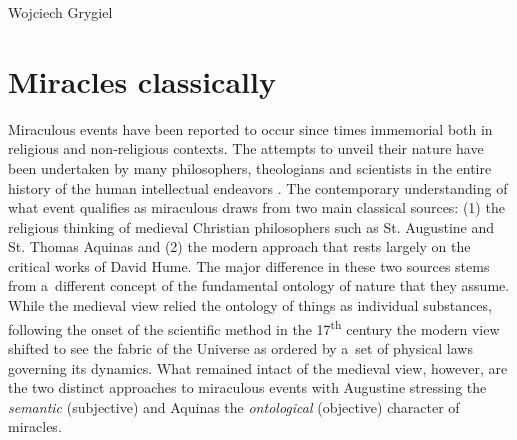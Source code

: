 \begin{artengenv}{Wojciech Grygiel}
\section*{Miracles classically}
Miraculous events have been reported to occur since times immemorial both in religious and non-religious contexts. The attempts to unveil their nature have been undertaken by many philosophers, theologians and scientists in the entire history of the human intellectual endeavors
\parencite[e.g.][]{basinger_miracles_2018}. %
 The contemporary understanding of what event qualifies as miraculous draws from two main classical sources: (1) the religious thinking of medieval Christian philosophers such as St. Augustine and St. Thomas Aquinas and (2) the modern approach that rests largely on the critical works of David Hume. The major difference in these two sources stems from a~different concept of the fundamental ontology of nature that they assume. While the medieval view relied the ontology of things as individual substances, following the onset of the scientific method in the 17\textsuperscript{th} century the modern view shifted to see the fabric of the Universe as ordered by a~set of physical laws governing its dynamics. What remained intact of the medieval view, however, are the two distinct approaches to miraculous events with Augustine stressing the \textit{semantic} (subjective) and Aquinas the \textit{ontological} (objective) character of miracles.


\end{artengenv}
